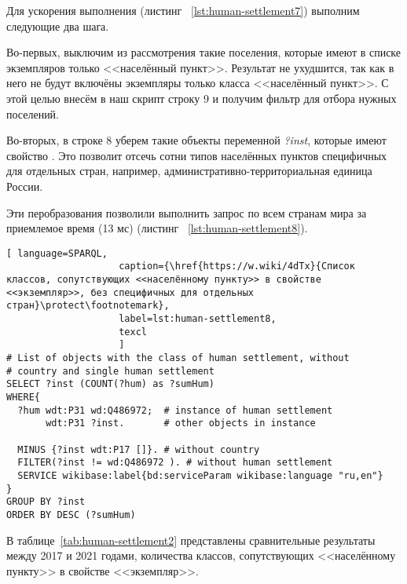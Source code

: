 Для ускорения выполнения (листинг ~\protect\ref{lst:human-settlement7}) выполним следующие два шага.
 
Во-первых, выключим из рассмотрения такие поселения, которые имеют в списке экземпляров только <<населённый пункт>>. Результат не ухудшится, так как в него не будут включёны экземпляры только класса <<населённый пункт>>. С этой целью внесём в наш скрипт строку \num{9} и получим фильтр для отбора нужных поселений.

Во-вторых, в строке \num{8} уберем такие объекты переменной \emph{?inst}, которые имеют свойство . Это позволит отсечь сотни типов населённых пунктов специфичных для отдельных стран, например, административно-территориальная единица России.

Эти перобразования позволили выполнить запрос по всем странам мира за приемлемое время (13 мс) (листинг ~\protect\ref{lst:human-settlement8}).

\lstset{numbers=left, firstnumber=1, frame=single}
\begin{lstlisting}[ language=SPARQL, 
                    caption={\href{https://w.wiki/4dTx}{Cписок классов, сопутствующих <<населённому пункту>> в свойстве <<экземпляр>>, без специфичных для отдельных стран}\protect\footnotemark},
                    label=lst:human-settlement8,
                    texcl 
                    ]
# List of objects with the class of human settlement, without 
# country and single human settlement
SELECT ?inst (COUNT(?hum) as ?sumHum) 
WHERE{ 
  ?hum wdt:P31 wd:Q486972;  # instance of human settlement
       wdt:P31 ?inst.       # other objects in instance
  
  MINUS {?inst wdt:P17 []}. # without country
  FILTER(?inst != wd:Q486972 ). # without human settlement
  SERVICE wikibase:label{bd:serviceParam wikibase:language "ru,en"}
}  
GROUP BY ?inst 
ORDER BY DESC (?sumHum)
\end{lstlisting}%

В таблице~\ref{tab:human-settlement2} представлены сравнительные результаты между 2017  и 2021 годами, количества классов, сопутствующих <<населённому пункту>> в свойстве <<экземпляр>>.

